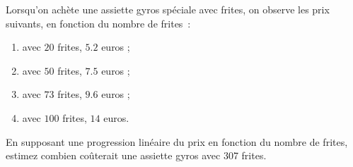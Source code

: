 \begin{exercice}\label{exoMatlab0008}

	Lorsqu'on achète une assiette gyros spéciale avec frites, on observe les prix suivants, en fonction du nombre de frites~:
	\begin{enumerate}

		\item
			avec $20$ frites, $5.2$ euros ;
		\item
			avec $50$ frites, $7.5$ euros ;
		\item
			avec $73$ frites, $9.6$ euros ;
		\item
			avec $100$ frites, $14$ euros.

	\end{enumerate}
	En supposant une progression linéaire du prix en fonction du nombre de frites, estimez combien coûterait une assiette gyros avec 307 frites.


\end{exercice}
